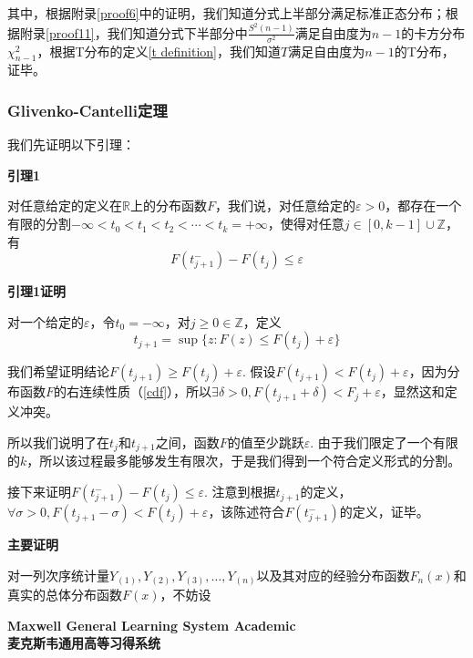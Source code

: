 \documentclass[UTF8]{ctexbook}
\begin{document}
其中，根据附录\ref{proof6}中的证明，我们知道分式上半部分满足标准正态分布；根据附录\ref{proof11}，我们知道分式下半部分中$\frac{S^2(n-1)}{\sigma^2}$满足自由度为$n-1$的卡方分布$\chi_{n-1}^2$，根据T分布的定义\ref{t definition}，我们知道$T$满足自由度为$n-1$的T分布，证毕。

\subsubsection{Glivenko-Cantelli定理}
\label{glivenko-cantelli-proof}
我们先证明以下引理：

\noindent\textbf{引理1}

对任意给定的定义在$\mathbb{R}$上的分布函数$F$，我们说，对任意给定的$\varepsilon>0$，都存在一个有限的分割$-\infty<t_0<t_1<t_2<\cdots<t_k=+\infty$，使得对任意$j\in[0,k-1]\cup\mathbb{Z}$，有
\[
	F(t_{j+1}^-)-F(t_j)\leq\varepsilon
\]

\noindent\textbf{引理1证明}

对一个给定的$\varepsilon$，令$t_0=-\infty$，对$j\geq0\in\mathbb{Z}$，定义
\[
	t_{j+1}=\sup\{z:F(z)\leq F(t_j)+\varepsilon\}
\]

我们希望证明结论$F(t_{j+1})\geq F(t_j)+\varepsilon$. 假设$F(t_{j+1})< F(t_j)+\varepsilon$，因为分布函数$F$的右连续性质（\ref{cdf}），所以$\exists\delta>0,F(t_{j+1}+\delta)<F_j+\varepsilon$，显然这和定义冲突。

所以我们说明了在$t_{j}$和$t_{j+1}$之间，函数$F$的值至少跳跃$\varepsilon$. 由于我们限定了一个有限的$k$，所以该过程最多能够发生有限次，于是我们得到一个符合定义形式的分割。

接下来证明$F(t_{j+1}^-)-F(t_j)\leq\varepsilon$. 注意到根据$t_{j+1}$的定义，$\forall\sigma>0,F(t_{j+1}-\sigma)<F(t_j)+\varepsilon$，该陈述符合$F(t^-_{j+1})$的定义，证毕。

\noindent\textbf{主要证明}

对一列次序统计量$Y_{(1)},Y_{(2)},Y_{(3)},\dots,Y_{(n)}$以及其对应的经验分布函数$F_n(x)$和真实的总体分布函数$F(x)$，不妨设


\vfill
\noindent \textbf{Maxwell General Learning System Academic}\\
\textbf{麦克斯韦通用高等习得系统}\\
\end{document}
